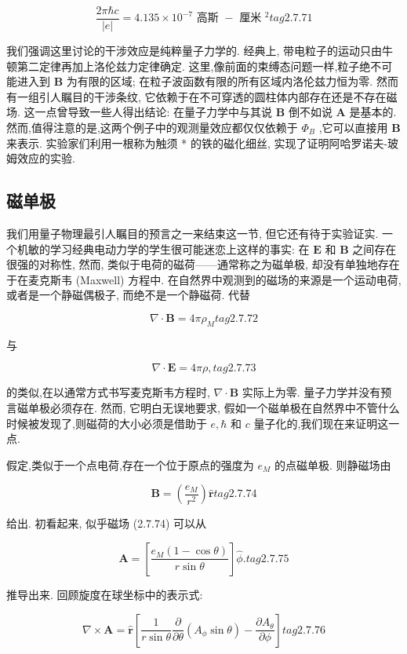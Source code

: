 \documentclass[lang=cn,newtx,10pt,scheme=chinese,thmcnt=section]{elegantbook}
\begin{document}
$$
\frac{{2\pi }\hbar c}{\left| e\right| } = {4.135} \times {10}^{-7}\text{ 高斯 } - \text{ 厘米 }{}^{2} tag{2.7.71}
$$

我们强调这里讨论的干涉效应是纯粹量子力学的. 经典上, 带电粒子的运动只由牛顿第二定律再加上洛伦兹力定律确定. 这里,像前面的束缚态问题一样,粒子绝不可能进入到 $\mathbf{B}$ 为有限的区域; 在粒子波函数有限的所有区域内洛伦兹力恒为零. 然而有一组引人瞩目的干涉条纹, 它依赖于在不可穿透的圆柱体内部存在还是不存在磁场. 这一点曾导致一些人得出结论: 在量子力学中与其说 $\mathbf{B}$ 倒不如说 $\mathbf{A}$ 是基本的. 然而,值得注意的是,这两个例子中的观测量效应都仅仅依赖于 ${\Phi }_{B}$ ,它可以直接用 $\mathbf{B}$ 来表示. 实验家们利用一根称为触须 * 的铁的磁化细丝, 实现了证明阿哈罗诺夫-玻姆效应的实验.

\subsection*{磁单极} 
我们用量子物理最引人瞩目的预言之一来结束这一节, 但它还有待于实验证实. 一个机敏的学习经典电动力学的学生很可能迷恋上这样的事实: 在 $\mathbf{E}$ 和 $\mathbf{B}$ 之间存在很强的对称性, 然而, 类似于电荷的磁荷——通常称之为磁单极, 却没有单独地存在于在麦克斯韦 (Maxwell) 方程中. 在自然界中观测到的磁场的来源是一个运动电荷, 或者是一个静磁偶极子, 而绝不是一个静磁荷. 代替

$$
\nabla \cdot \mathbf{B} = {4\pi }{\rho }_{M} tag{2.7.72}
$$

与

$$
\nabla \cdot \mathbf{E} = {4\pi \rho }, tag{2.7.73}
$$

的类似,在以通常方式书写麦克斯韦方程时, $\nabla \cdot \mathbf{B}$ 实际上为零. 量子力学并没有预言磁单极必须存在. 然而, 它明白无误地要求, 假如一个磁单极在自然界中不管什么时候被发现了,则磁荷的大小必须是借助于 $e,\hbar$ 和 $c$ 量子化的,我们现在来证明这一点.

假定,类似于一个点电荷,存在一个位于原点的强度为 ${e}_{M}$ 的点磁单极. 则静磁场由

$$
\mathbf{B} = \left( \frac{{e}_{M}}{{r}^{2}}\right) \widehat{\mathbf{r}} tag{2.7.74}
$$

给出. 初看起来, 似乎磁场 (2.7.74) 可以从

$$
\mathbf{A} = \left\lbrack \frac{{e}_{M}\left( {1 - \cos \theta }\right) }{r\sin \theta }\right\rbrack \widehat{\phi }. tag{2.7.75}
$$

推导出来. 回顾旋度在球坐标中的表示式:

$$
\nabla \times \mathbf{A} = \widehat{\mathbf{r}}\left\lbrack {\frac{1}{r\sin \theta }\frac{\partial }{\partial \theta }\left( {{A}_{\phi }\sin \theta }\right) - \frac{\partial {A}_{\theta }}{\partial \phi }}\right\rbrack tag{2.7.76}
$$
\end{document}
